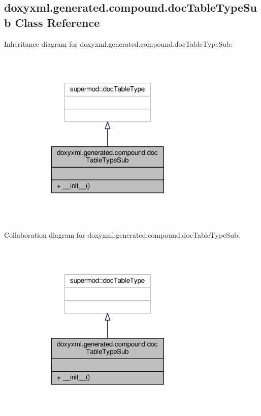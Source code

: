 \subsection{doxyxml.\+generated.\+compound.\+doc\+Table\+Type\+Sub Class Reference}
\label{classdoxyxml_1_1generated_1_1compound_1_1docTableTypeSub}


Inheritance diagram for doxyxml.\+generated.\+compound.\+doc\+Table\+Type\+Sub\+:
\nopagebreak
\begin{figure}[H]
\begin{center}
\leavevmode
\includegraphics[width=246pt]{df/d8c/classdoxyxml_1_1generated_1_1compound_1_1docTableTypeSub__inherit__graph}
\end{center}
\end{figure}


Collaboration diagram for doxyxml.\+generated.\+compound.\+doc\+Table\+Type\+Sub\+:
\nopagebreak
\begin{figure}[H]
\begin{center}
\leavevmode
\includegraphics[width=246pt]{df/d5c/classdoxyxml_1_1generated_1_1compound_1_1docTableTypeSub__coll__graph}
\end{center}
\end{figure}
